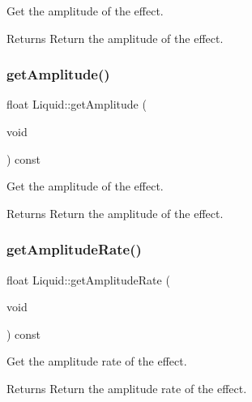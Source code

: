 Get the amplitude of the effect. 

\begin{DoxyReturn}{Returns}
Return the amplitude of the effect. 
\end{DoxyReturn}
\mbox{\label{classLiquid_aaa57e3822c4898e355f1a1fd8f149251}} 
\subsubsection{\texorpdfstring{get\+Amplitude()}{getAmplitude()}\hspace{0.1cm}{\footnotesize\ttfamily [2/2]}}
{\footnotesize\ttfamily float Liquid\+::get\+Amplitude (\begin{DoxyParamCaption}\item[{void}]{ }\end{DoxyParamCaption}) const\hspace{0.3cm}{\ttfamily [inline]}}



Get the amplitude of the effect. 

\begin{DoxyReturn}{Returns}
Return the amplitude of the effect. 
\end{DoxyReturn}
\mbox{\label{classLiquid_ad2061dd34f3cf9f30a416f15c9bcbad1}} 
\subsubsection{\texorpdfstring{get\+Amplitude\+Rate()}{getAmplitudeRate()}\hspace{0.1cm}{\footnotesize\ttfamily [1/2]}}
{\footnotesize\ttfamily float Liquid\+::get\+Amplitude\+Rate (\begin{DoxyParamCaption}\item[{void}]{ }\end{DoxyParamCaption}) const\hspace{0.3cm}{\ttfamily [inline]}}



Get the amplitude rate of the effect. 

\begin{DoxyReturn}{Returns}
Return the amplitude rate of the effect. 
\end{DoxyReturn}
\mbox{\label{classLiquid_ad2061dd34f3cf9f30a416f15c9bcbad1}} 
